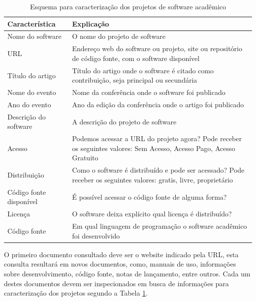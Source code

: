\begin{table}[h]
\caption{Esquema para caracterização dos projetos de software acadêmico}
\centering
\begin{tabular}{ l p{11cm} }
  \hline
  Característica           & Explicação \\
  \hline
  Nome do software         & O nome do projeto de software \\
  URL                      & Endereço web do software ou projeto, site ou repositório de código fonte, com o software disponível \\
  Título do artigo         & Título do artigo onde o software é citado como contribuição, seja principal ou secundária \\
  Nome do evento           & Nome da conferência onde o software foi publicado \\
  Ano do evento            & Ano da edição da conferência onde o artigo foi publicado \\
  Descrição do software    & A descrição do projeto de software \\
  Acesso                   & Podemos acessar a URL do projeto agora? Pode receber os seguintes valores: Sem Acesso, Acesso Pago, Acesso Gratuito \\
  Distribuição             & Como o software é distribuído e pode ser acessado? Pode receber os seguintes valores: gratis, livre, proprietário \\
  Código fonte disponível  & É possível acessar o código fonte de alguma forma? \\
  Licença                  & O software deixa explícito qual licença é distribuído? \\
  Código fonte             & Em qual linguagem de programação o software acadêmico foi desenvolvido \\
  \hline
\end{tabular}
\label{esquema-caracteristicas}
\end{table}

O primeiro documento consultado deve ser o website indicado pela URL, esta
consulta resultará em novos documentos, como, manuais de uso, informações sobre
desenvolvimento, código fonte, notas de lançamento, entre outros. Cada um
destes documentos devem ser inspecionados em busca de informações para
caracterização dos projetos segundo a Tabela \ref{esquema-caracteristicas}.

